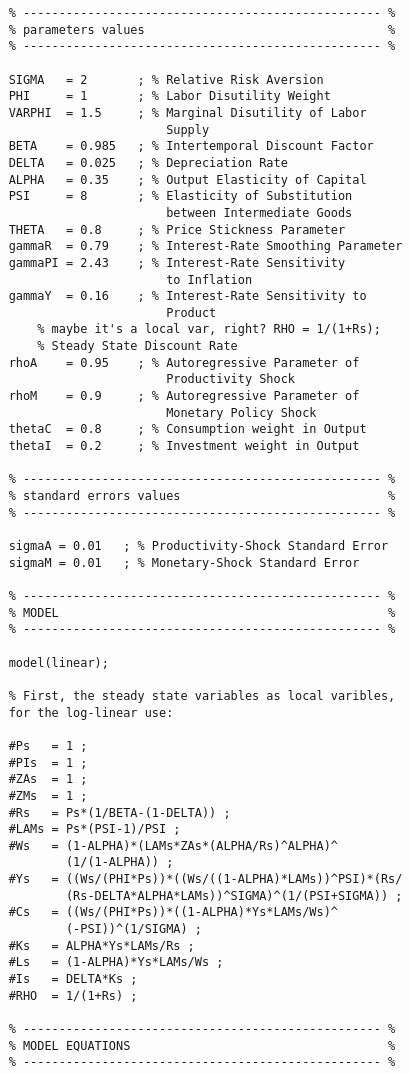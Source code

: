 \documentclass[
	12pt,
	]{article}
\numberwithin{equation}{section}
\theoremstyle{definition}
\theoremstyle{plain}
\theoremstyle{plain}
\theoremstyle{plain}
\begin{document}
\begin{verbatim}
	% -------------------------------------------------- %
	% parameters values                                  %
	% -------------------------------------------------- % 
	
	SIGMA   = 2       ; % Relative Risk Aversion
	PHI     = 1       ; % Labor Disutility Weight
	VARPHI  = 1.5     ; % Marginal Disutility of Labor 
	                      Supply
	BETA    = 0.985   ; % Intertemporal Discount Factor
	DELTA   = 0.025   ; % Depreciation Rate
	ALPHA   = 0.35    ; % Output Elasticity of Capital
	PSI     = 8       ; % Elasticity of Substitution 
	                      between Intermediate Goods
	THETA   = 0.8     ; % Price Stickness Parameter
	gammaR  = 0.79    ; % Interest-Rate Smoothing Parameter
	gammaPI = 2.43    ; % Interest-Rate Sensitivity 
	                      to Inflation
	gammaY  = 0.16    ; % Interest-Rate Sensitivity to 
	                      Product
		% maybe it's a local var, right? RHO = 1/(1+Rs); 
		% Steady State Discount Rate
	rhoA    = 0.95    ; % Autoregressive Parameter of 
	                      Productivity Shock
	rhoM    = 0.9     ; % Autoregressive Parameter of 
	                      Monetary Policy Shock
	thetaC  = 0.8     ; % Consumption weight in Output
	thetaI  = 0.2     ; % Investment weight in Output
	
	% -------------------------------------------------- % 
	% standard errors values                             %
	% -------------------------------------------------- %
	
	sigmaA = 0.01   ; % Productivity-Shock Standard Error
	sigmaM = 0.01   ; % Monetary-Shock Standard Error
	
	% -------------------------------------------------- %
	% MODEL                                              %
	% -------------------------------------------------- %
	
	model(linear);
	
	% First, the steady state variables as local varibles, 
	for the log-linear use:
	
	#Ps   = 1 ;
	#PIs  = 1 ;
	#ZAs  = 1 ;
	#ZMs  = 1 ;
	#Rs   = Ps*(1/BETA-(1-DELTA)) ;
	#LAMs = Ps*(PSI-1)/PSI ;
	#Ws   = (1-ALPHA)*(LAMs*ZAs*(ALPHA/Rs)^ALPHA)^
	        (1/(1-ALPHA)) ;
	#Ys   = ((Ws/(PHI*Ps))*((Ws/((1-ALPHA)*LAMs))^PSI)*(Rs/
	        (Rs-DELTA*ALPHA*LAMs))^SIGMA)^(1/(PSI+SIGMA)) ;
	#Cs   = ((Ws/(PHI*Ps))*((1-ALPHA)*Ys*LAMs/Ws)^
	        (-PSI))^(1/SIGMA) ;
	#Ks   = ALPHA*Ys*LAMs/Rs ;
	#Ls   = (1-ALPHA)*Ys*LAMs/Ws ;
	#Is   = DELTA*Ks ;
	#RHO  = 1/(1+Rs) ;
	
	% -------------------------------------------------- % 
	% MODEL EQUATIONS                                    %
	% -------------------------------------------------- %
	

\end{verbatim}
\end{document}
